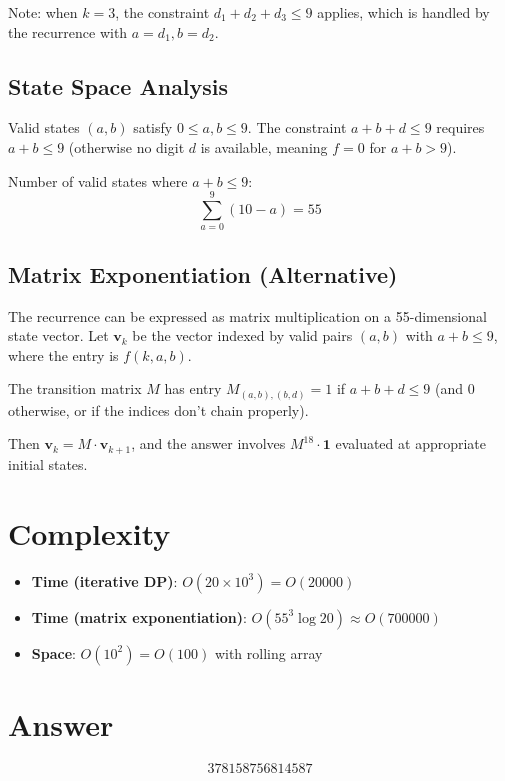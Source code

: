 \documentclass[12pt]{article}
\begin{document}
Note: when $k = 3$, the constraint $d_1 + d_2 + d_3 \leq 9$ applies, which is handled by the recurrence with $a = d_1, b = d_2$.

\subsection{State Space Analysis}

Valid states $(a, b)$ satisfy $0 \leq a, b \leq 9$. The constraint $a + b + d \leq 9$ requires $a + b \leq 9$ (otherwise no digit $d$ is available, meaning $f = 0$ for $a + b > 9$).

Number of valid states where $a + b \leq 9$:
\[
\sum_{a=0}^{9} (10 - a) = 55
\]

\subsection{Matrix Exponentiation (Alternative)}

The recurrence can be expressed as matrix multiplication on a 55-dimensional state vector. Let $\mathbf{v}_k$ be the vector indexed by valid pairs $(a,b)$ with $a+b \leq 9$, where the entry is $f(k, a, b)$.

The transition matrix $M$ has entry $M_{(a,b),(b,d)} = 1$ if $a + b + d \leq 9$ (and 0 otherwise, or if the indices don't chain properly).

Then $\mathbf{v}_k = M \cdot \mathbf{v}_{k+1}$, and the answer involves $M^{18} \cdot \mathbf{1}$ evaluated at appropriate initial states.

\section{Complexity}
\begin{itemize}
    \item \textbf{Time (iterative DP)}: $O(20 \times 10^3) = O(20000)$
    \item \textbf{Time (matrix exponentiation)}: $O(55^3 \log 20) \approx O(700000)$
    \item \textbf{Space}: $O(10^2) = O(100)$ with rolling array
\end{itemize}

\section{Answer}

\[
\boxed{378158756814587}
\]
\end{document}
